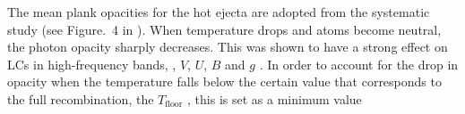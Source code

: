 %
The mean plank opacities for the hot ejecta are adopted from the systematic study 
(see Figure.~4 in \citet{Tanaka:2019iqp}).
When temperature drops and atoms become neutral, the photon opacity sharply decreases. 
This was shown to have a strong effect on 
\acp{LC} in high-frequency bands, \eg, $V$, $U$, $B$ and $g$ \citep{Villar:2017oya}. In order to account 
for the drop in opacity when the temperature falls below the certain value that corresponds to the full 
recombination, the $T_{\text{floor}}$ \citep{Kasen:2017sxr,Kasen:2018drm}, this is set as a minimum value 
